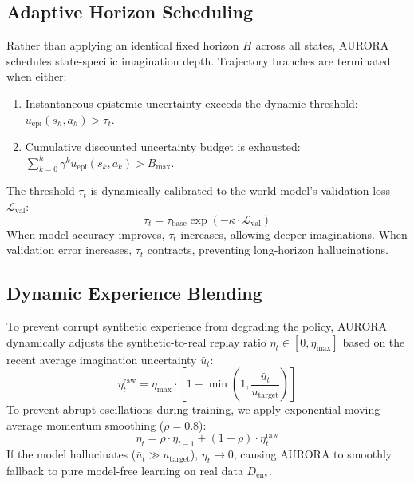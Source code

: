\documentclass[11pt,a4paper]{article}
\theoremstyle{definition}
\theoremstyle{remark}
\begin{document}
\subsection{Adaptive Horizon Scheduling}
Rather than applying an identical fixed horizon $H$ across all states, AURORA schedules state-specific imagination depth. Trajectory branches are terminated when either:
\begin{enumerate}
    \item Instantaneous epistemic uncertainty exceeds the dynamic threshold: $u_{\text{epi}}(s_h, a_h) > \tau_t$.
    \item Cumulative discounted uncertainty budget is exhausted: $\sum_{k=0}^h \gamma^k u_{\text{epi}}(s_k, a_k) > B_{\max}$.
\end{enumerate}
The threshold $\tau_t$ is dynamically calibrated to the world model's validation loss $\mathcal{L}_{\text{val}}$:
\begin{equation}
    \tau_t = \tau_{\text{base}} \exp\left( -\kappa \cdot \mathcal{L}_{\text{val}} \right)
\end{equation}
When model accuracy improves, $\tau_t$ increases, allowing deeper imaginations. When validation error increases, $\tau_t$ contracts, preventing long-horizon hallucinations.

\subsection{Dynamic Experience Blending}
To prevent corrupt synthetic experience from degrading the policy, AURORA dynamically adjusts the synthetic-to-real replay ratio $\eta_t \in [0, \eta_{\max}]$ based on the recent average imagination uncertainty $\bar{u}_t$:
\begin{equation}
    \eta_t^{\text{raw}} = \eta_{\max} \cdot \left[ 1 - \min\left(1, \frac{\bar{u}_t}{u_{\text{target}}}\right) \right]
\end{equation}
To prevent abrupt oscillations during training, we apply exponential moving average momentum smoothing ($\rho = 0.8$):
\begin{equation}
    \eta_t = \rho \cdot \eta_{t-1} + (1 - \rho) \cdot \eta_t^{\text{raw}}
\end{equation}
If the model hallucinates ($\bar{u}_t \gg u_{\text{target}}$), $\eta_t \to 0$, causing AURORA to smoothly fallback to pure model-free learning on real data $D_{\text{env}}$.
\end{document}
